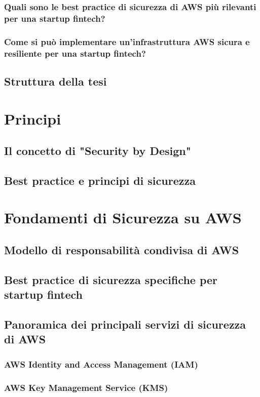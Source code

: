 \documentclass[a4paper,12pt]{report}
\begin{document}
\subsection{Quali sono le best practice di sicurezza di AWS più rilevanti per una startup fintech?}
\subsection{Come si può implementare un'infrastruttura AWS sicura e resiliente per una startup fintech?}
\section{Struttura della tesi}

\chapter{Principi}
\section{Il concetto di "Security by Design"}
\section{Best practice e principi di sicurezza}

\chapter{Fondamenti di Sicurezza su AWS}
\section{Modello di responsabilità condivisa di AWS}
\section{Best practice di sicurezza specifiche per startup fintech}
\section{Panoramica dei principali servizi di sicurezza di AWS}
\subsection{AWS Identity and Access Management (IAM)}
\subsection{AWS Key Management Service (KMS)}
\end{document}
